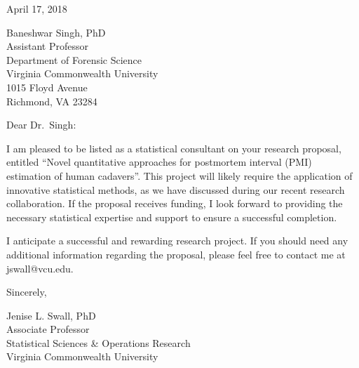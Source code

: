 \documentclass[12pt]{article}
\begin{document}
\pagestyle{empty}

\vspace*{0.5in}

\noindent April 17, 2018

\vspace*{0.3in}

\noindent Baneshwar Singh, PhD\\
Assistant Professor\\
Department of Forensic Science\\
Virginia Commonwealth University\\
1015 Floyd Avenue\\
Richmond, VA 23284


\vspace*{0.3in}

\noindent Dear Dr.~Singh:

\vspace{0.2in}

\noindent I am pleased to be listed as a statistical consultant on
your research proposal, entitled ``Novel quantitative approaches for
postmortem interval (PMI) estimation of human cadavers''.  This
project will likely require the application of innovative statistical
methods, as we have discussed during our recent research collaboration.
If the proposal receives funding, I look forward to providing the
necessary statistical expertise and support to ensure a successful
completion.

\vspace{0.2in}

\noindent I anticipate a successful and rewarding research project.
If you should need any additional information regarding the proposal,
please feel free to contact me at jswall@vcu.edu.

\vspace*{0.3in}

\noindent Sincerely,

\vspace*{0.5in}

\noindent Jenise L. Swall, PhD\\
\noindent Associate Professor\\
\noindent Statistical Sciences \& Operations Research\\
\noindent Virginia Commonwealth University
\end{document}
